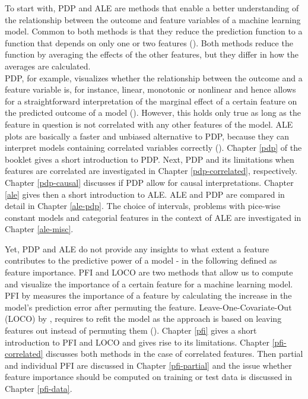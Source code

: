 \documentclass[]{krantz}
\begin{document}
To start with, PDP and ALE are methods that enable a better
understanding of the relationship between the outcome and feature
variables of a machine learning model. Common to both methods is that
they reduce the prediction function to a function that depends on only
one or two features (\citet{molnar2019}). Both methods reduce the
function by averaging the effects of the other features, but they differ
in how the averages are calculated.\\
PDP, for example, visualizes whether the relationship between the
outcome and a feature variable is, for instance, linear, monotonic or
nonlinear and hence allows for a straightforward interpretation of the
marginal effect of a certain feature on the predicted outcome of a model
(\citet{friedman2001greedy}). However, this holds only true as long as
the feature in question is not correlated with any other features of the
model. ALE plots are basically a faster and unbiased alternative to PDP,
because they can interpret models containing correlated variables
correctly (\citet{molnar2019}). Chapter \ref{pdp} of the booklet gives a
short introduction to PDP. Next, PDP and its limitations when features
are correlated are investigated in Chapter \ref{pdp-correlated},
respectively. Chapter \ref{pdp-causal} discusses if PDP allow for causal
interpretations. Chapter \ref{ale} gives then a short introduction to
ALE. ALE and PDP are compared in detail in Chapter \ref{ale-pdp}. The
choice of intervals, problems with pice-wise constant models and
categorial features in the context of ALE are investigated in Chapter
\ref{ale-misc}.

Yet, PDP and ALE do not provide any insights to what extent a feature
contributes to the predictive power of a model - in the following
defined as feature importance. PFI and LOCO are two methods that allow
us to compute and visualize the importance of a certain feature for a
machine learning model. PFI by \citet{breiman2001random} measures the
importance of a feature by calculating the increase in the model's
prediction error after permuting the feature. Leave-One-Covariate-Out
(LOCO) by \citet{lei2018distribution}, requires to refit the model as
the approach is based on leaving features out instead of permuting them
(\citet{casalicchio2018visualizing}). Chapter \ref{pfi} gives a short
introduction to PFI and LOCO and gives rise to its limitations. Chapter
\ref{pfi-correlated} discusses both methods in the case of correlated
features. Then partial and individual PFI are discussed in Chapter
\ref{pfi-partial} and the issue whether feature importance should be
computed on training or test data is discussed in Chapter
\ref{pfi-data}.
\end{document}
